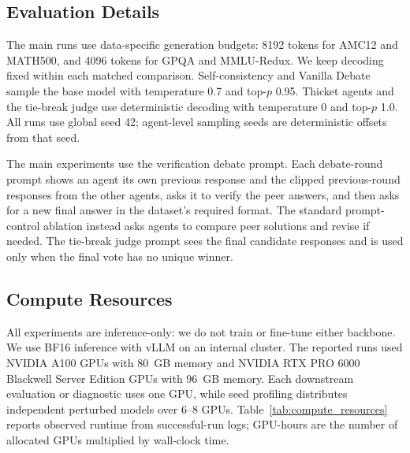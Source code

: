 \subsection{Evaluation Details}
\label{app:eval_details}

The main runs use data-specific generation budgets: 8192 tokens for AMC12 and
MATH500, and 4096 tokens for GPQA and MMLU-Redux. We keep
decoding fixed within each matched comparison. Self-consistency and Vanilla
Debate sample the base model with temperature 0.7 and top-$p$ 0.95. Thicket
agents and the tie-break judge use deterministic decoding with temperature 0
and top-$p$ 1.0. All runs use global seed 42; agent-level sampling seeds are
deterministic offsets from that seed.

The main experiments use the verification debate prompt. Each debate-round
prompt shows an agent its own previous response and the clipped previous-round
responses from the other agents, asks it to verify the peer answers, and then
asks for a new final answer in the dataset's required format. The standard
prompt-control ablation instead asks agents to compare peer solutions and
revise if needed. The tie-break judge prompt sees the final candidate responses
and is used only when the final vote has no unique winner.

\subsection{Compute Resources}
\label{app:compute_resources}

All experiments are inference-only: we do not train or fine-tune either
backbone. We use BF16 inference with vLLM on an internal cluster. The reported
runs used NVIDIA A100 GPUs with 80~GB memory and NVIDIA RTX PRO 6000 Blackwell
Server Edition GPUs with 96~GB memory. Each downstream evaluation or diagnostic
uses one GPU, while seed profiling distributes independent perturbed models
over 6--8 GPUs. Table~\ref{tab:compute_resources} reports observed runtime from
successful-run logs; GPU-hours are the number of allocated GPUs multiplied by
wall-clock time.


